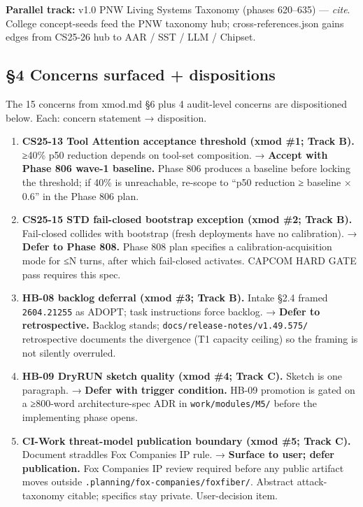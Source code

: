 \documentclass[11pt,letterpaper]{article}
\newcommand{\arxivid}[1]{\texttt{\textcolor{accent}{#1}}}
\begin{document}
\textbf{Parallel track:} v1.0 PNW Living Systems Taxonomy (phases
620--635) --- \emph{cite}. College concept-seeds feed the PNW taxonomy
hub; cross-references.json gains edges from CS25-26 hub to AAR / SST /
LLM / Chipset.

\subsection{§4 Concerns surfaced +
dispositions}

The 15 concerns from xmod.md §6 plus 4 audit-level concerns are
dispositioned below. Each: concern statement → disposition.

\begin{enumerate}
\def\labelenumi{\arabic{enumi}.}
\item
  \textbf{CS25-13 Tool Attention acceptance threshold (xmod \#1; Track
  B).} ≥40\% p50 reduction depends on tool-set composition. →
  \textbf{Accept with Phase 806 wave-1 baseline.} Phase 806 produces a
  baseline before locking the threshold; if 40\% is unreachable,
  re-scope to ``p50 reduction ≥ baseline × 0.6'' in the Phase 806 plan.
\item
  \textbf{CS25-15 STD fail-closed bootstrap exception (xmod \#2; Track
  B).} Fail-closed collides with bootstrap (fresh deployments have no
  calibration). → \textbf{Defer to Phase 808.} Phase 808 plan specifies
  a calibration-acquisition mode for ≤N turns, after which fail-closed
  activates. CAPCOM HARD GATE pass requires this spec.
\item
  \textbf{HB-08 backlog deferral (xmod \#3; Track B).} Intake §2.4
  framed \arxivid{2604.21255} as ADOPT; task instructions force backlog.
  → \textbf{Defer to retrospective.} Backlog stands;
  \texttt{docs/release-notes/v1.49.575/} retrospective documents the
  divergence (T1 capacity ceiling) so the framing is not silently
  overruled.
\item
  \textbf{HB-09 DryRUN sketch quality (xmod \#4; Track C).} Sketch is
  one paragraph. → \textbf{Defer with trigger condition.} HB-09
  promotion is gated on a ≥800-word architecture-spec ADR in
  \texttt{work/modules/M5/} before the implementing phase opens.
\item
  \textbf{CI-Work threat-model publication boundary (xmod \#5; Track
  C).} Document straddles Fox Companies IP rule. → \textbf{Surface to
  user; defer publication.} Fox Companies IP review required before any
  public artifact moves outside
  \texttt{.planning/fox-companies/foxfiber/}. Abstract attack-taxonomy
  citable; specifics stay private. User-decision item.

\end{enumerate}
\end{document}
